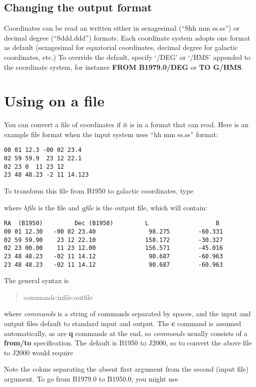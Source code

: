 \subsection{Changing the output format}

Coordinates can be read an written either in 
sexagesimal (``Shh mm ss.ss'') or decimal degree (``Sddd.ddd'')
formats. Each coordinate system adopts one format as default
(sexagesimal for equatorial coordinates, decimal degree for
galactic coordinates, etc.) To override the default, specify
`/DEG' or `/HMS' appended to the coordinate system, for instance 
{\bf FROM B1979.0/DEG} or {\bf TO G/HMS}.

\section{Using \pr on a file}

You can convert a file of coordinates if it is in a format
that \pr can read. Here is an example file format when
the input system uses ``hh mm ss.ss'' format:

\begin{verbatim}
00 01 12.3 -00 02 23.4
02 59 59.9  23 12 22.1
02 23 0  11 23 12
23 48 48.23 -2 11 14.123
\end{verbatim}

To transform this file from B1950 to galactic coordinates,
type \begin{quote} \end{quote}
where {\it bfile} is the file and {\it gfile} is the output file,
which will contain:

\begin{verbatim}
RA  (B1950)         Dec (B1950)         L                   B
00 01 12.30   -00 02 23.40               98.275        -60.331
02 59 59.90    23 12 22.10              158.172        -30.327
02 23 00.00    11 23 12.00              156.571        -45.016
23 48 48.23   -02 11 14.12               90.687        -60.963
23 48 48.23   -02 11 14.12               90.687        -60.963
\end{verbatim}

The general syntax is 
\begin{quote} \pr  commands:infile:outfile \end{quote}
where {\it commands} is a string of \pr commands separated
by spaces, and the input and output files default to 
standard input and output. The {\bf c} command is assumed automatically,
as are {\bf q} commands at the end, so {\it commands} usually
consists of a {\bf from/to} specification. The default is B1950 to J2000,
so to convert the above file to J2000 would require
\begin{quote} \end{quote}
Note the colons separating the absent first
argument from the second (input file) argument.
To go from B1979.0 to B1950.0, you might use
\begin{quote} \end{quote}


